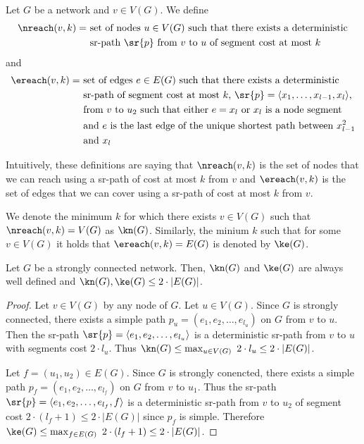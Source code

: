 \begin{definition}
Let $G$ be a network and $v \in V(G)$. We define
\begin{align*}
\nreach(v, k) = & \ \textrm{set of nodes $u \in V(G)$ such that there exists a deterministic} \\ 
                & \ \textrm{sr-path $\sr{p}$ from $v$ to $u$ of segment cost at most $k$}
\end{align*}
and
\begin{align*}
\ereach(v, k) = & \ \textrm{set of edges $e \in E(G)$ such that there exists a deterministic} \\ 
                & \ \textrm{sr-path of segment cost at most $k$, $\sr{p} = \langle x_1, \ldots, x_{l - 1}, x_l \rangle$,} \\
                & \ \textrm{from $v$ to $u_2$ such that either $e = x_l$ or $x_l$ is a node segment} \\
                & \ \textrm{and $e$ is the last edge of the unique shortest path between $x^2_{l - 1}$} \\
                & \ \textrm{and $x_l$}
\end{align*}
\end{definition}

Intuitively, these definitions are saying that $\nreach(v, k)$ is the set of nodes that
we can reach using a sr-path of cost at most $k$ from $v$ and $\ereach(v, k)$ is the
set of edges that we can cover using a sr-path of cost at most $k$ from $v$.

We denote the minimum $k$ for which there exists $v \in V(G)$ such that $\nreach(v, k) = V(G)$ as $\kn(G)$. 
Similarly, the minium $k$ such that for some $v \in V(G)$ it holds that $\ereach(v, k) = E(G)$ is denoted by $\ke(G)$.

\begin{proposition}
Let $G$ be a strongly connected network. Then, $\kn(G)$ and $\ke(G)$ are always well defined and $\kn(G), \ke(G) \leq 2 \cdot |E(G)|$.
\end{proposition}

\begin{proof}
Let $v \in V(G)$ by any node of $G$. Let $u \in V(G)$. Since $G$ is strongly connected, there exists a simple path $p_u = (e_1, e_2, \ldots, e_{l_u})$ on $G$ from $v$ to $u$.
Then the sr-path $\sr{p} = \langle e_1, e_2, \ldots, e_{l_u} \rangle$ is a deterministic sr-path from $v$ to $u$ with segments cost
$2 \cdot l_u$. Thus $\kn(G) \leq \max_{u \in V(G)} \ 2 \cdot l_u \leq 2 \cdot |E(G)|$.

Let $f = (u_1, u_2) \in E(G)$. Since $G$ is strongly conencted, there exists a simple path $p_f = (e_1, e_2, \ldots, e_{l_f})$ on $G$ from
$v$ to $u_1$. Thus the sr-path $\sr{p} = \langle e_1, e_2, \ldots, e_{l_f}, f \rangle$ is a deterministic sr-path from $v$ to $u_2$ of
segment cost $2 \cdot (l_f + 1) \leq 2 \cdot |E(G)|$ since $p_f$ is simple. Therefore $\ke(G) \leq \max_{f \in E(G)} \ 2 \cdot (l_f + 1) \leq 2 \cdot |E(G)|$.
\end{proof}

